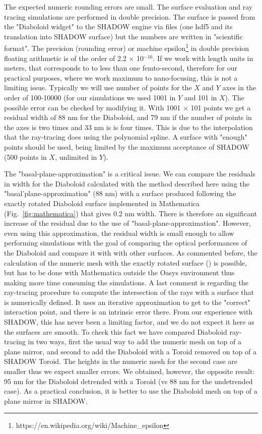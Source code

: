 \documentclass[a4paper, 11pt]{article}
\begin{document}
 
The expected numeric rounding errors are small. The surface evaluation and ray tracing simulations are performed in double precision. The surface is passed from the "Diaboloid widget" to the SHADOW engine via files (one hdf5 and its translation into SHADOW surface) but the numbers are written in "scientific format". The precision (rounding error) or machine epsilon\footnote{ https://en.wikipedia.org/wiki/Machine\_epsilon} in double precision floating arithmetic is of the order of 2.2 $\times$ 10$^{-16}$. If we work with length units in meters, that corresponds to to less than one femto-second, therefore for our practical purposes, where we work maximum to nano-focusing, this is not a limiting issue. Typically we will use number of points for the $X$ and $Y$ axes in the order of 100-10000 (for our simulations we used 1001 in $Y$ and 101 in $X$). The possible error can be checked by modifying it. With 1001 $\times$ 101 points we get a residual width of 88 nm for the Diaboloid, and 79 nm if the number of points in the axes is two times and 33 nm is is four times. This is due to the interpolation that the ray-tracing does using the polynomial spline. A surface with "enough" points should be used, being limited by the maximum acceptance of SHADOW (500 points in $X$, unlimited in $Y$). 

The "basal-plane-approximation" is a critical issue. We can compare the residuals in width for the Diaboloid calculated with the method described here using the "basal'plane-approximation" (88 nm) with a surface produced following the exactly rotated Diaboloid surface \cite{Valeriy2020b} implemented in Mathematica \cite{lacey}  (Fig.~\ref{fig:mathematica}) that gives 0.2 nm width. There is therefore an significant increase of the residual due to the use of "basal-plane-approximation". However, even using this approximation, the residual width is small enough to allow performing simulations with the goal of comparing the optical performances of the Diaboloid and compare it with with other surfaces. As commented before, the calculation of the numeric mesh with the exactly rotated surface (\cite{Valeriy2020b}) is possible, but has to be done with Mathematica outside the Oasys environment thus making more time consuming the simulations.  A last comment is regarding the ray-tracing procedure to compute the intersection of the rays with a surface that is numerically defined. It uses an iterative approximation to get to the "correct" interaction point, and there is an intrinsic error there. From our experience with SHADOW, this has never been a limiting factor, and we do not expect it here as the surfaces are smooth. To check this fact we have compared  Diaboloid ray-tracing in two ways, first the usual way to add the numeric mesh on top of a plane mirror, and second to add the Diaboloid with a Toroid removed on top of a SHADOW Toroid. The heights in the numeric mesh for the second case are smaller thus we expect smaller errors. We obtained, however, the opposite result: 95 nm for the Diaboloid detrended with a Toroid (vs 88 nm for the undetrended case). As a practical conclusion, it is better to use the Diaboloid mesh on top of a plane mirror in SHADOW.
\end{document}
